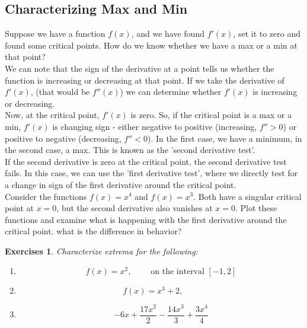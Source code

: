 \documentclass[12pt,a4paper]{article} %
\newtheorem{exer}{Exercises}
\begin{document}
\subsection{Characterizing Max and Min}
Suppose we have a function $f(x)$, and we have found $f'(x)$, set it to zero and found some critical points. How do we know whether we have a max or a min at that point? \\

We can note that the sign of the derivative at a point tells us whether the function is increasing or decreasing at that point. If we take the derivative of $f'(x)$, (that would be $f''(x)$) we can determine whether $f'(x)$ is increasing or decreasing. \\

Now, at the critical point, $f'(x)$ is zero. So, if the critical point is a max or a min, $f'(x)$ is changing sign - either negative to positive (increasing, $f'' >0$) or positive to negative (decreasing, $f'' <0$). In the first case, we have a minimum, in the second case, a max. This is known as the 'second derivative test'.\\

If the second derivative is zero at the critical point, the second derivative test fails. In this case, we can use the 'first derivative test', where we directly test for a change in sign of the first derivative around the critical point. \\

Consider the functions $f(x) = x^4$ and $f(x) = x^3$. Both have a singular critical point at $x = 0$, but the second derivative also vanishes at $x=0$. Plot these functions and examine what is happening with the first derivative around the critical point. what is the difference in behavior?\\

\begin{exer}
Characterize extrema for the following:

\begin{enumerate}
\item 
$$f(x) = x^2, \;\;\;\;\;\;\;\textrm{ on the interval } [-1,2]$$

\item 
$$f(x) = x^3 + 2, \;\;\;\;\;\;\;$$

\item 

$$-6 x + \frac{17 x^2}{2} - \frac{14 x^3}{3} + \frac{3 x^4}{4}$$
\end{enumerate}

\end{exer}
\end{document}
